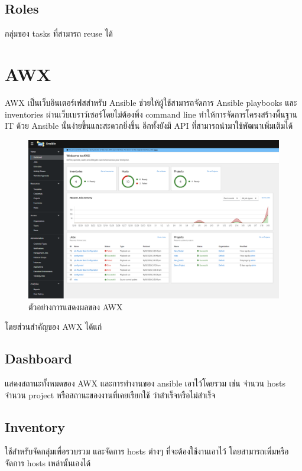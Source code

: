 \subsection{Roles}
\hspace{0.5in} กลุ่มของ tasks ที่สามารถ reuse ได้

\section{AWX}
\hspace{0.5in} AWX เป็นเว็บอินเตอร์เฟสสำหรับ Ansible ช่วยให้ผู้ใช้สามารถจัดการ Ansible playbooks และ inventories ผ่านเว็บเบราว์เซอร์โดยไม่ต้องพึ่ง command line ทำให้การจัดการโครงสร้างพื้นฐาน IT ด้วย Ansible นั้นง่ายขึ้นและสะดวกยิ่งขึ้น 
อีกทั้งยังมี API ที่สามารถนำมาใช้พัฒนาเพิ่มเติมได้

\begin{figure}[h]
  \begin{center}
    \includegraphics[scale=0.55]{awx.png}
  \end{center}
  \caption[ตัวอย่างการแสดงผลของ AWX]{ตัวอย่างการแสดงผลของ AWX}
  \label{fig:ansible_playbook}
\end{figure}

\hspace{0.3in} โดยส่วนสำคัญของ AWX ได้แก่


\subsection{Dashboard}
\hspace{0.5in} แสดงสถานะทั้งหมดของ AWX และการทำงานของ ansible เอาไว้โดยรวม เช่น จำนวน hosts จำนวน project หรือสถานะของงานที่เคยเรียกใช้ ว่าสำเร็จหรือไม่สำเร็จ

\subsection{Inventory}
\hspace{0.5in} ใช้สำหรับจัดกลุ่มเพื่อรวบรวม และจัดการ hosts ต่างๆ ที่จะต้องใช้งานเอาไว้ โดยสามารถเพิ่มหรือจัดการ hosts เหล่านั้นเองได้

